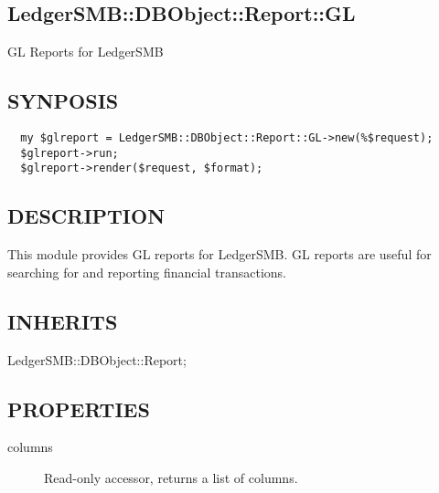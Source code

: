 \begin{description}
\begin{description}
\begin{description}
\begin{description}
\begin{description}
\begin{description}
\begin{description}
\begin{description}
\begin{description}
\begin{description}
\section{LedgerSMB::DBObject::Report::GL\label{LedgerSMB::DBObject::Report::GL}}


GL Reports for LedgerSMB

\subsection*{SYNPOSIS\label{LedgerSMB::DBObject::Report::GL_SYNPOSIS}}
\begin{verbatim}
  my $glreport = LedgerSMB::DBObject::Report::GL->new(%$request);
  $glreport->run;
  $glreport->render($request, $format);
\end{verbatim}
\subsection*{DESCRIPTION\label{LedgerSMB::DBObject::Report::GL_DESCRIPTION}}


This module provides GL reports for LedgerSMB.  GL reports are useful for 
searching for and reporting financial transactions.

\subsection*{INHERITS\label{LedgerSMB::DBObject::Report::GL_INHERITS}}
\begin{description}

\item[{LedgerSMB::DBObject::Report;}] \mbox{}\end{description}
\subsection*{PROPERTIES\label{LedgerSMB::DBObject::Report::GL_PROPERTIES}}
\begin{description}

\item[{columns}] \mbox{}

Read-only accessor, returns a list of columns.

\begin{description}


\end{description}
\end{description}
\end{description}
\end{description}
\end{description}
\end{description}
\end{description}
\end{description}
\end{description}
\end{description}
\end{description}
\end{description}
